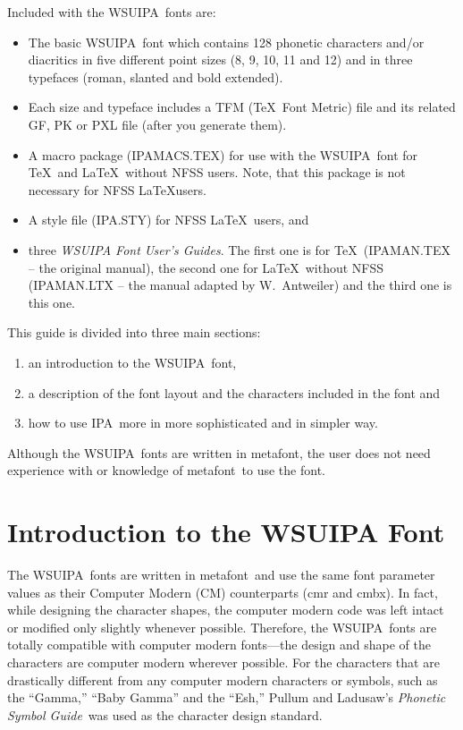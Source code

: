 \documentclass[12pt]{article}
\newcommand{\MF}{{\rm\sc{}metafont}}
\newcommand{\wsu}{{\small\rm WSUIPA}}
\newcommand{\ipam}{{\small\rm IPAMACS}}
\newcommand{\ipas}{{\small\rm IPA}}
\newcommand{\PL}{{\em Phonetic Symbol Guide}}
\begin{document}
Included with the \wsu\ fonts are:
%
\begin{itemize}
  \item The basic \wsu\ font which contains 128 phonetic characters
and/or diacritics in five different point sizes (8, 9, 10, 11 and 12)
and in three typefaces (roman, slanted and bold extended).
  \item Each size and typeface includes a TFM (\TeX\ Font Metric) file
and its related GF, PK or PXL file (after you generate them).
  \item A macro package (\ipam.TEX) for use with the \wsu\ font for
\TeX\ and \LaTeX\ without NFSS users. Note, that this package is not
necessary for NFSS \LaTeX users.
  \item A style file (\ipas.STY) for NFSS \LaTeX\ users, and
  \item three {\em WSUIPA Font User's Guides}. The first one is for
\TeX\ ({\small\rm IPAMAN.TEX} -- the original manual), the second one
for \LaTeX\ without NFSS ({\small\rm IPAMAN.LTX} -- the manual adapted
by W.~Antweiler) and the third one is this one.
\end{itemize}

This guide is divided into three main sections:
%
\begin{enumerate}
  \item an introduction to the \wsu\ font,
  \item a description of the font layout and the characters included
in the font and
  \item how to use \ipas\ more in more sophisticated and in simpler
way.
\end{enumerate}

Although the \wsu\ fonts are written in \MF, the user does not need
experience with or knowledge of \MF\ to use the font.


\section{Introduction to the WSUIPA Font}

The \wsu\ fonts are written in \MF\ and use the same font parameter
values as their Computer Modern (CM) counterparts (cmr and cmbx). In
fact, while designing the character shapes, the computer modern code
was left intact or modified only slightly whenever possible.
Therefore, the \wsu\ fonts are totally compatible with computer modern
fonts---the design and shape of the characters are computer modern
wherever possible. For the characters that are drastically different
from any computer modern characters or symbols, such as the ``Gamma,''
``Baby Gamma'' and the ``Esh,'' Pullum and Ladusaw's \PL\ was used as
the character design standard.
\end{document}
